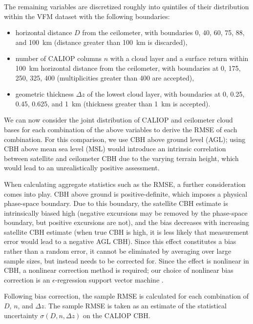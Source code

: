 \documentclass[essd,manuscript]{copernicus}\usepackage[]{graphicx}\usepackage[]{color}
\begin{document}
The remaining variables are discretized roughly into quintiles of their
distribution within the VFM dataset with the
following boundaries:
\begin{itemize}
\item horizontal distance $D$ from the ceilometer, with boundaries 0, 40, 60,
  75, 88, and 100~km (distance greater than 100~km is discarded),
\item number of CALIOP columns $n$ with a cloud layer and a surface return
  within 100~km horizontal distance from the ceilometer, with boundaries at 0,
  175, 250, 325, 400 (multiplicities greater than 400 are accepted),
\item geometric thickness $\Delta z$ of the lowest cloud layer, with boundaries
  at 0, 0.25, 0.45, 0.625, and 1~km (thickness greater than 1~km is accepted).
\end{itemize}

We can now consider the joint distribution of CALIOP and ceilometer cloud bases
for each combination of the above variables to derive the RMSE of each
combination.  For this comparison, we use CBH above ground level (AGL); using
CBH above mean sea level (MSL) would introduce an intrinsic correlation between
satellite and ceilometer CBH due to the varying terrain height, which would lead
to an unrealistically positive assessment.

When calculating aggregate statistics such as the RMSE, a further consideration
comes into play.  CBH above ground is positive-definite, which imposes a
physical phase-space boundary.  Due to this boundary, the satellite CBH estimate
is intrinsically biased high (negative excursions may be removed by the
phase-space boundary, but positive excursions are not), and the bias decreases
with increasing satellite CBH estimate (when true CBH is high, it is less likely
that measurement error would lead to a negative AGL CBH).  Since this effect
constitutes a bias rather than a random error, it cannot be eliminated by
averaging over large sample sizes, but instead needs to be corrected for.  Since
the effect is nonlinear in CBH, a nonlinear correction method is required; our
choice of nonlinear bias correction is an $\epsilon$-regression support vector
machine \citep[SVM][]{svm}.

Following bias correction, the sample RMSE is calculated for each combination of
$D$, $n$, and $\Delta z$.  The sample RMSE is taken as an estimate of the
statistical uncertainty $\sigma(D,n,\Delta z)$ on the CALIOP CBH.
\end{document}

